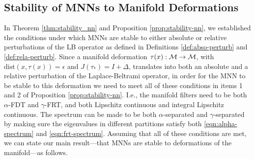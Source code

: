 
\subsection{Stability of MNNs to Manifold Deformations} \label{subsec:stability_mnn_def}

In Theorem \ref{thm:stability_nn} and Proposition \ref{prop:stability-nn}, we established the conditions under which MNNs are stable to either absolute or relative perturbations of the LB operator as defined in Definitions \ref{def:abso-perturb} and \ref{def:rela-perturb}. 
Since a manifold deformation $\tau(x):{\mathcal M}\rightarrow {\ensuremath{\mathcal M}}$, with $\text{dist}(x,\tau(x))=\epsilon$ and $J(\tau_*)=I+\Delta$, translates into both an absolute and a relative perturbation of the Laplace-Beltrami operator, in order for the MNN to be stable to this deformation we need to meet all of these conditions in items 1 and 2 of Proposition \ref{prop:stability-nn}.
I.e., the manifold filters need to be both $\alpha$-FDT and $\gamma$-FRT, and both Lipschitz continuous and integral Lipschitz continuous. The spectrum can be made to be both $\alpha$-separated and $\gamma$-separated by making sure the eigenvalues in different partitions satisfy both \eqref{eqn:alpha-spectrum} and \eqref{eqn:frt-spectrum}. Assuming that all of these conditions are met, we can state our main result---that MNNs are stable to deformations of the manifold---as follows.


